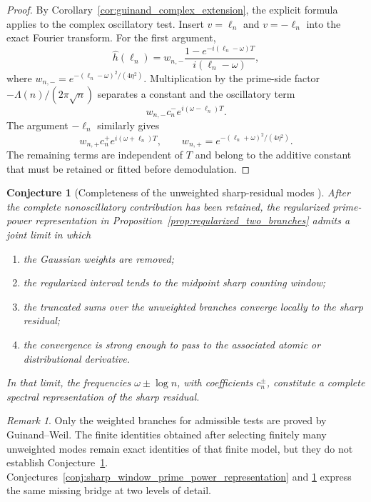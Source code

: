 \documentclass[11pt]{amsart}
\numberwithin{equation}{section}
\theoremstyle{plain}
\newtheorem{conjecture}[theorem]{Conjecture}
\theoremstyle{definition}
\theoremstyle{remark}
\newtheorem{remark}[theorem]{Remark}
\newcommand{\1}{\mathbf{1}}
\begin{document}
\begin{proof}
By Corollary~\ref{cor:guinand_complex_extension}, the explicit formula
applies to the complex oscillatory test.  Insert \(v=\ell_n\) and
\(v=-\ell_n\) into the exact Fourier transform.
For the first argument,
\begin{equation}
\widehat h(\ell_n)
=
w_{n,-}
\frac{1-e^{-i(\ell_n-\omega)T}}
{i(\ell_n-\omega)},
\label{eq:branch_minus_fourier_insert}
\end{equation}
where \(w_{n,-}=e^{-(\ell_n-\omega)^2/(4\eta^2)}\).  Multiplication by the
prime-side factor \(-\Lambda(n)/(2\pi\sqrt n)\) separates a constant and
the oscillatory term
\begin{equation}
w_{n,-}c_n^-e^{i(\omega-\ell_n)T}.
\label{eq:branch_minus_oscillatory_proof}
\end{equation}
The argument \(-\ell_n\) similarly gives
\begin{equation}
w_{n,+}c_n^+e^{i(\omega+\ell_n)T},
\qquad
w_{n,+}=e^{-(\ell_n+\omega)^2/(4\eta^2)}.
\label{eq:branch_plus_oscillatory_proof}
\end{equation}
The remaining terms are independent of \(T\) and belong to the additive
constant that must be retained or fitted before demodulation.
\end{proof}


\begin{conjecture}[Completeness of the unweighted sharp-residual modes {\normalfont[Conjecture]}]
\label{conj:regularized_to_sharp_completeness}
After the complete nonoscillatory contribution has been retained, the
regularized prime-power representation in
Proposition~\ref{prop:regularized_two_branches} admits a joint limit in which
\begin{enumerate}[label=\textup{(\roman*)}]
\item the Gaussian weights are removed;
\item the regularized interval tends to the midpoint sharp counting window;
\item the truncated sums over the unweighted branches converge locally to the
sharp residual;
\item the convergence is strong enough to pass to the associated atomic or
distributional derivative.
\end{enumerate}
In that limit, the frequencies \(\omega\pm\log n\), with coefficients
\(c_n^\pm\), constitute a complete spectral representation of the sharp
residual.
\end{conjecture}

\begin{remark}
\label{rem:regularized_exact_sharp_conjecture}
Only the weighted branches for admissible tests are proved by
Guinand--Weil.  The finite identities obtained after selecting finitely many
unweighted modes remain exact identities of that finite model, but they do
not establish Conjecture~\ref{conj:regularized_to_sharp_completeness}.
Conjectures~\ref{conj:sharp_window_prime_power_representation} and
\ref{conj:regularized_to_sharp_completeness} express the same missing bridge
at two levels of detail.
\end{remark}
\end{document}
